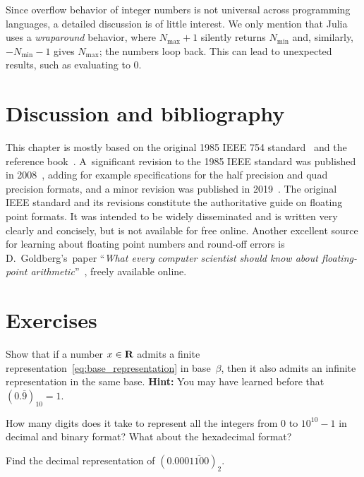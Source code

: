 Since overflow behavior of integer numbers is not universal across programming languages,
a detailed discussion is of little interest.
We only mention that Julia uses a \emph{wraparound} behavior,
where $N_{\max} + 1$ silently returns $N_{\min}$ and,
similarly, $-N_{\min} - 1$ gives $N_{\max}$;
the numbers loop back.
This can lead to unexpected results,
such as  evaluating to 0.

\section{Discussion and bibliography}%
\label{sec:discussion_and_bibliograhpy}
This chapter is mostly based on the original 1985 IEEE 754 standard~\cite{ieee754} and the reference book~\cite{MR2265914}.
A~significant revision to the 1985 IEEE standard was published in 2008~\cite{ieee2008},
adding for example specifications for the half precision and quad precision formats,
and a minor revision was published in 2019~\cite{ieee2019}.
The original IEEE standard and its revisions constitute the authoritative guide on floating point formats.
It was intended to be widely disseminated and is written very clearly and concisely,
but is not available for free online.
Another excellent source for learning about floating point numbers and round-off errors is D.\ Goldberg's~paper ``\emph{What every computer scientist should know about floating-point arithmetic}''~\cite{goldberg1991every},
freely available online.

\section{Exercises}
\begin{exercise}
    \label{exercise:non_unique_representation}
    Show that if a number $x \in \mathbf R$ admits a finite representation~\eqref{eq:base_representation} in base~$\beta$,
    then it also admits an infinite representation in the same base.
    \textbf{Hint:} You may have learned before that $(0.\overline 9)_{10} = 1$.
\end{exercise}

\begin{exercise}
    How many digits does it take to represent all the integers from 0 to $10^{10} - 1$ in decimal and binary format?
    What about the hexadecimal format?
\end{exercise}

\begin{exercise}
    Find the decimal representation of $(0.000\overline{1100})_2$.
\end{exercise}

